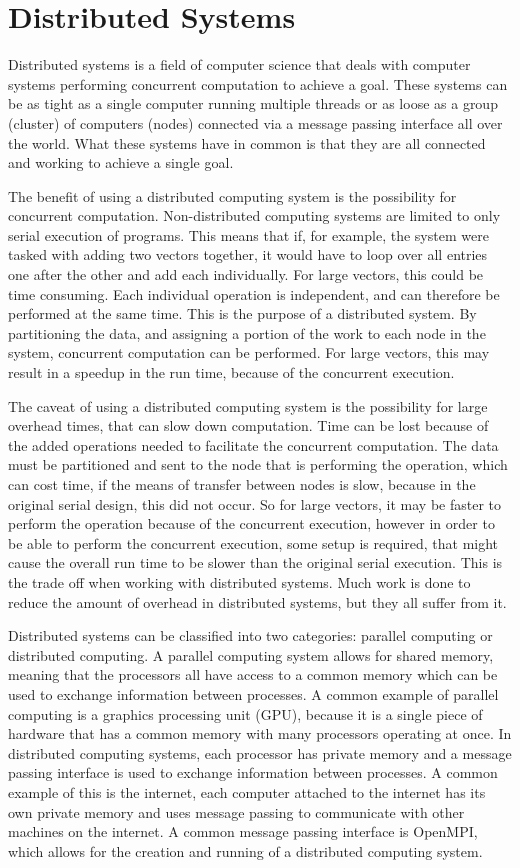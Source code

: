 \section{Distributed Systems}
Distributed systems is a field of computer science that deals with computer systems performing concurrent computation to achieve a goal. These systems can be as tight as a single computer running multiple threads or as loose as a group (cluster) of computers (nodes) connected via a message passing interface all over the world. What these systems have in common is that they are all connected and working to achieve a single goal.

The benefit of using a distributed computing system is the possibility for concurrent computation. Non-distributed computing systems are limited to only serial execution of programs. This means that if, for example, the system were tasked with adding two vectors together, it would have to loop over all entries one after the other and add each individually. For large vectors, this could be time consuming. Each individual operation is independent, and can therefore be performed at the same time. This is the purpose of a distributed system. By partitioning the data, and assigning a portion of the work to each node in the system, concurrent computation can be performed. For large vectors, this may result in a speedup in the run time, because of the concurrent execution.

The caveat of using a distributed computing system is the possibility for large overhead times, that can slow down computation. Time can be lost because of the added operations needed to facilitate the concurrent computation. The data must be partitioned and sent to the node that is performing the operation, which can cost time, if the means of transfer between nodes is slow, because in the original serial design, this did not occur. So for large vectors, it may be faster to perform the operation because of the concurrent execution, however in order to be able to perform the concurrent execution, some setup is required, that might cause the overall run time to be slower than the original serial execution. This is the trade off when working with distributed systems. Much work is done to reduce the amount of overhead in distributed systems, but they all suffer from it.

Distributed systems can be classified into two categories: parallel computing or distributed computing. A parallel computing system allows for shared memory, meaning that the processors all have access to a common memory which can be used to exchange information between processes. A common example of parallel computing is a graphics processing unit (GPU), because it is a single piece of hardware that has a common memory with many processors operating at once. In distributed computing systems, each processor has private memory and a message passing interface is used to exchange information between processes. A common example of this is the internet, each computer attached to the internet has its own private memory and uses message passing to communicate with other machines on the internet. A common message passing interface is OpenMPI, which allows for the creation and running of a distributed computing system.

